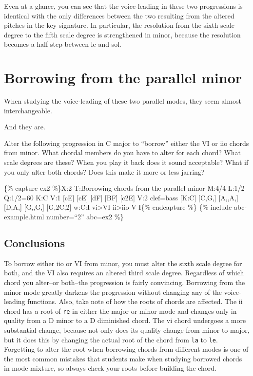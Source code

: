 \documentclass{book}
\begin{document}
Even at a glance, you can see that the voice-leading in these two progressions
is identical with the only differences between the two resulting from the
altered pitches in the key signature. In particular, the resolution from the
sixth scale degree to the fifth scale degree is strengthened in minor, because
the resolution becomes a half-step between le and sol.

\hypertarget{borrowing-from-the-parallel-minor}{%
\section{Borrowing from the parallel
minor}\label{borrowing-from-the-parallel-minor}}

When studying the voice-leading of these two parallel modes, they seem almost
interchangeable.

And they are.

Alter the following progression in C major to ``borrow'' either the VI or iio
chords from minor. What chordal members do you have to alter for each chord?
What scale degrees are these? When you play it back does it sound acceptable?
What if you only alter both chords? Does this make it more or less jarring?

\{\% capture ex2 \%\}X:2 T:Borrowing chords from the parallel minor M:4/4
L:1/2 Q:1/2=60 K:C V:1 {[}cE{]} {[}cE{]}\textbar{} {[}dF{]} {[}BF{]}\textbar{}
{[}c2E{]}\textbar{]} V:2 clef=bass {[}K:C{]} {[}C,G,{]} {[}A,,A,{]}\textbar{}
{[}D,A,{]} {[}G,,G,{]}\textbar{} {[}G,2C,2{]}\textbar{]} w:C:I
vi\textgreater VI ii\textgreater iio V I\{\% endcapture \%\} \{\% include
abc-example.html number=``2'' abc=ex2 \%\}

\hypertarget{conclusions-8}{%
\subsection{Conclusions}\label{conclusions-8}}

To borrow either iio or VI from minor, you must alter the sixth scale degree
for both, and the VI also requires an altered third scale degree. Regardless
of which chord you alter--or both--the progression is fairly convincing.
Borrowing from the minor mode greatly darkens the progression without changing
any of the voice-leading functions. Also, take note of how the roots of chords
are affected. The ii chord has a root of \texttt{re} in either the major or
minor mode and changes only in quality from a D minor to a D diminished chord.
The vi chord undergoes a more substantial change, because not only does its
quality change from minor to major, but it does this by changing the actual
root of the chord from \texttt{la} to \texttt{le}. Forgetting to alter the
root when borrowing chords from different modes is one of the most common
mistakes that students make when studying borrowed chords in mode mixture, so
always check your roots before building the chord.
\end{document}
